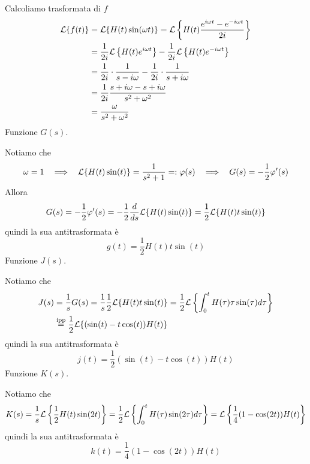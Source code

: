 Calcoliamo trasformata di $f$
\begin{align*}
\mathcal{L}\{f(t)\} & = \mathcal{L}\{H(t)\sin(\omega t)\} = \mathcal{L}\left\{H(t)\frac{e^{i\omega t} - e^{- i\omega t}}{2i}\right\}\\
 & = \frac{1}{2i}\mathcal{L}\left\{H(t) e^{i\omega t}\right\} - \frac{1}{2i}\mathcal{L}\left\{H(t) e^{- i\omega t}\right\}\\
 & = \frac{1}{2i} \cdot \frac{1}{s - i\omega} - \frac{1}{2i} \cdot \frac{1}{s + i\omega}\\
 & = \frac{1}{2i}\frac{s + i\omega - s + i\omega}{s^{2} + \omega^{2}}\\
 & = \frac{\omega}{s^{2} + \omega^{2}}
\end{align*}
Funzione $G(s)$.

Notiamo che
\begin{equation*}
\omega = 1\ \ \implies \ \ \Lc\{H(t)\sin(t)\} = \frac{1}{s^{2} + 1} = :\varphi (s) \ \ \implies \ \ G(s) = - \frac{1}{2} \varphi '(s)
\end{equation*}
Allora
\begin{equation*}
G(s) = - \frac{1}{2} \varphi '(s) = - \frac{1}{2}\frac{d}{ds}\mathcal{L}\{H(t)\sin(t)\} = \frac{1}{2}\mathcal{L}\{H(t) t\sin(t)\}
\end{equation*}
quindi la sua antitrasformata è
\begin{equation*}
g(t) = \frac{1}{2} H(t) t\sin(t)
\end{equation*}
Funzione $J(s)$.

Notiamo che
\begin{align*}
J(s) & = \frac{1}{s} G(s) = \frac{1}{s}\frac{1}{2}\mathcal{L}\{H(t) t\sin(t)\} = \frac{1}{2}\mathcal{L}\left\{\int^{t}_{0} H(\tau) \tau \sin(\tau) d\tau \right\}\\
 & \overset{\text{ipp}}{=}\frac{1}{2}\mathcal{L}\{(\sin(t) - t\cos(t)) H(t)\}
\end{align*}
quindi la sua antitrasformata è
\begin{equation*}
j(t) = \frac{1}{2}(\sin(t) - t\cos(t)) H(t)
\end{equation*}
Funzione $K(s)$.

Notiamo che
\begin{equation*}
K(s) = \frac{1}{s}\mathcal{L}\left\{\frac{1}{2}H(t)\sin(2t)\right\} = \frac{1}{2}\mathcal{L}\left\{\int^{t}_{0} H(\tau)\sin(2\tau) d\tau \right\} = \mathcal{L}\left\{\frac{1}{4}(1 - \cos(2t)) H(t)\right\}
\end{equation*}
quindi la sua antitrasformata è
\begin{equation*}
k(t) = \frac{1}{4}(1 - \cos(2t)) H(t)
\end{equation*}

